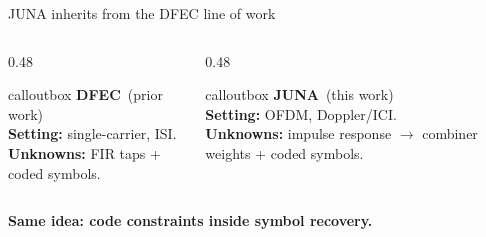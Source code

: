 \documentclass[aspectratio=169,10pt]{beamer}
\begin{document}
\begin{frame}{JUNA inherits from the DFEC line of work}
  \vspace{0.4cm}
  \begin{columns}[T,onlytextwidth]
    \begin{column}{0.48\textwidth}
      \begin{beamercolorbox}[wd=\linewidth,sep=10pt,rounded=true]{calloutbox}
        \textbf{\color{accent} DFEC} \,{\scriptsize\color{muted}(prior work)}\\[0.5em]
        \small
        \textbf{Setting:} single-carrier, ISI.\\[0.35em]
        \textbf{Unknowns:} FIR taps + coded symbols.
      \end{beamercolorbox}
    \end{column}
    \begin{column}{0.48\textwidth}
      \begin{beamercolorbox}[wd=\linewidth,sep=10pt,rounded=true]{calloutbox}
        \textbf{\color{juna} JUNA} \,{\scriptsize\color{muted}(this work)}\\[0.5em]
        \small
        \textbf{Setting:} OFDM, Doppler/ICI.\\[0.35em]
        \textbf{Unknowns:} impulse response \(\to\) combiner weights + coded symbols.
      \end{beamercolorbox}
    \end{column}
  \end{columns}
  \vspace{0.6cm}
  \begin{center}
    \large\bfseries\color{accent}
    Same idea: code constraints inside symbol recovery.
  \end{center}
\end{frame}
\end{document}
